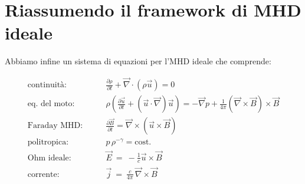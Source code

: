 %
%
\newpage
\section{Riassumendo il framework di MHD ideale}
Abbiamo infine un sistema di equazioni per l'MHD ideale che comprende:

\begin{equation}
	\label{sistema MHD}
	\begin{aligned}
		\text{continuità:} \qquad 
		& \frac{\partial \rho}{\partial t} + \vec\nabla \cdot (\rho \vec u) = 0 \\		
		\text{eq.\ del moto:} \qquad 
		& \rho\!\left( \frac{\partial \vec u}{\partial t} + (\vec u \cdot \vec\nabla)\vec u \right)
		= -\vec\nabla p + \frac{1}{4\pi}(\vec\nabla \times \vec B)\times \vec B \\
		\text{Faraday MHD:} \qquad 
		& \frac{\partial \vec B}{\partial t}
		= \vec\nabla \times (\vec u \times \vec B) \\
		\text{politropica:} \qquad 
		& p\,\rho^{-\gamma} = \text{cost.}\\
		\text{Ohm ideale:} \qquad 
		& \vec E\ =\ -\frac{1}{c}\vec u\times \vec B\\
		\text{corrente:} \qquad 
		& \vec j\ =\ \frac{c}{4\pi} \, \vec \nabla\times \vec B
	\end{aligned}
\end{equation}

